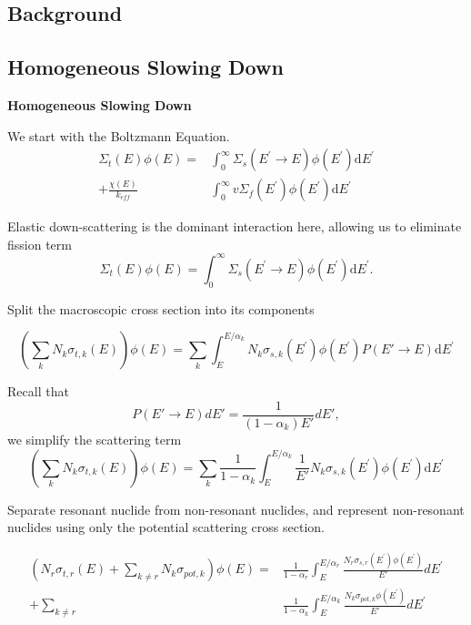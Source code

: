 \documentclass{beamer}
\begin{document}
\begin{frame}

\section{Background}
\subsection{Homogeneous Slowing Down}
  \textbf{Homogeneous Slowing Down}

We start with the Boltzmann Equation.
  \begin{align*}\Sigma_{t}(E)\phi(E)=&\int_{0}^{\infty}\Sigma_{s}\left(E^{\prime}\rightarrow E\right)\phi\left(E^{\prime}\right)\mathrm{d}E^{\prime}\\+\frac{\chi(E)}{k_{eff}}&\int_{0}^{\infty}v\Sigma_{f}\left(E^{\prime}\right)\phi\left(E^{\prime}\right)\mathrm{d}E^{\prime}\end{align*}

Elastic down-scattering is the dominant interaction here, allowing us to eliminate fission term
\begin{equation*}\Sigma_{t}(E)\phi(E)=\int_{0}^{\infty}\Sigma_{s}\left(E^{\prime}\rightarrow E\right)\phi\left(E^{\prime}\right)\mathrm{d}E^{\prime}.\end{equation*}

  Split the macroscopic cross section into its components

  \begin{equation*}\left(\sum\limits_{k}N_{k}\sigma_{t,k}(E)\right)\phi(E)=\sum\limits_{k}\int_{E}^{E/\alpha_{k}}N_{k}\sigma_{s,k}\left(E^{\prime}\right)\phi\left(E^{\prime}\right)P(E'\rightarrow E)\mathrm{d}E^{\prime}\end{equation*}
\end{frame}
\begin{frame}
Recall that 
\begin{equation*}P(E'\rightarrow E)dE'=\frac{1}{(1-\alpha_k)E'}dE',\end{equation*}
  we simplify the scattering term
\begin{equation*}\left(\sum\limits_{k}N_{k}\sigma_{t,k}(E)\right)\phi(E)=\sum\limits_{k}\frac{1}{1-\alpha_{k}}\int_{E}^{E/\alpha_{k}}\frac{1}{E'}N_{k}\sigma_{s,k}\left(E^{\prime}\right)\phi\left(E^{\prime}\right)\mathrm{d}E^{\prime}\end{equation*}

Separate resonant nuclide from non-resonant nuclides, and represent non-resonant nuclides using only the potential scattering cross section.

  \begin{align*} \left(N_{r}\sigma_{t,r}(E)+\sum\limits_{k\neq r}N_{k}\sigma_{pot,k}\right)\phi(E)=&\frac{1}{1-\alpha_{r}}\int_{E}^{E/\alpha_{r}}\frac{N_{r}\sigma_{s,r}\left(E^{\prime}\right)\phi\left(E^{\prime}\right)}{E'}dE^{\prime}\\ + \sum\limits_{k\neq r}&\frac{1}{1-\alpha_{k}}\int_{E}^{E/\alpha_{k}}\frac{N_{k}\sigma_{pot,k}\phi\left(E^{\prime}\right)}{E'}dE^{\prime}\end{align*}
  
\end{frame}
\end{document}
